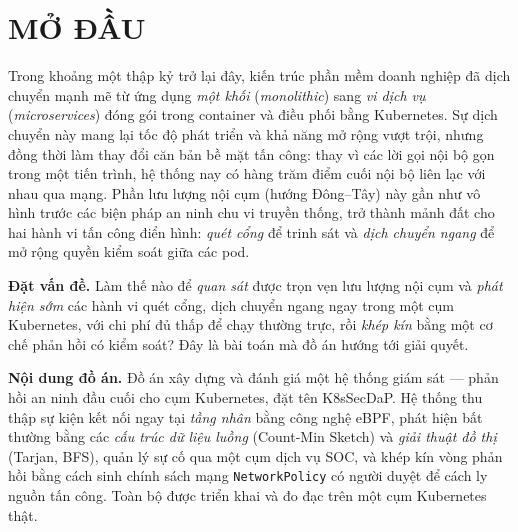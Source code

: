 
\chapter*{MỞ ĐẦU}
{}

Trong khoảng một thập kỷ trở lại đây, kiến trúc phần mềm doanh nghiệp đã dịch chuyển mạnh
mẽ từ ứng dụng \emph{một khối} (\textit{monolithic}) sang \emph{vi dịch vụ}
(\textit{microservices}) đóng gói trong container và điều phối bằng Kubernetes. Sự dịch
chuyển này mang lại tốc độ phát triển và khả năng mở rộng vượt trội, nhưng đồng thời làm
thay đổi căn bản bề mặt tấn công: thay vì các lời gọi nội bộ gọn trong một tiến trình, hệ
thống nay có hàng trăm điểm cuối nội bộ liên lạc với nhau qua mạng. Phần lưu lượng nội cụm
(hướng Đông--Tây) này gần như vô hình trước các biện pháp an ninh chu vi truyền thống, trở
thành mảnh đất cho hai hành vi tấn công điển hình: \emph{quét cổng} để trinh sát và
\emph{dịch chuyển ngang} để mở rộng quyền kiểm soát giữa các pod.

\textbf{Đặt vấn đề.} Làm thế nào để \emph{quan sát} được trọn vẹn lưu lượng nội cụm và
\emph{phát hiện sớm} các hành vi quét cổng, dịch chuyển ngang ngay trong một cụm Kubernetes,
với chi phí đủ thấp để chạy thường trực, rồi \emph{khép kín} bằng một cơ chế phản hồi có
kiểm soát? Đây là bài toán mà đồ án hướng tới giải quyết.

\textbf{Nội dung đồ án.} Đồ án xây dựng và đánh giá một hệ thống giám sát --- phản hồi an
ninh đầu cuối cho cụm Kubernetes, đặt tên K8sSecDaP. Hệ thống thu thập sự kiện kết nối ngay
tại \emph{tầng nhân} bằng công nghệ eBPF, phát hiện bất thường bằng các \emph{cấu trúc dữ
liệu luồng} (Count-Min Sketch) và \emph{giải thuật đồ thị} (Tarjan, BFS), quản lý sự cố qua
một cụm dịch vụ SOC, và khép kín vòng phản hồi bằng cách sinh chính sách mạng
\texttt{NetworkPolicy} có người duyệt để cách ly nguồn tấn công. Toàn bộ được triển khai và
đo đạc trên một cụm Kubernetes thật.

